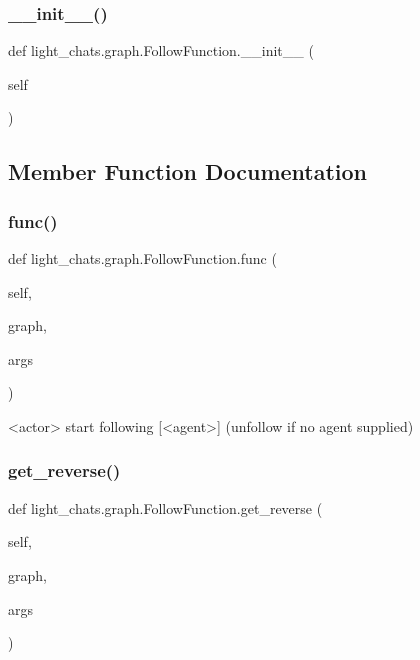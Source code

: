 \subsubsection{\texorpdfstring{\+\_\+\+\_\+init\+\_\+\+\_\+()}{\_\_init\_\_()}}
{\footnotesize\ttfamily def light\+\_\+chats.\+graph.\+Follow\+Function.\+\_\+\+\_\+init\+\_\+\+\_\+ (\begin{DoxyParamCaption}\item[{}]{self }\end{DoxyParamCaption})}



\subsection{Member Function Documentation}
\mbox{\label{classlight__chats_1_1graph_1_1FollowFunction_a6d1937938725b143930c10260adae130}} 
\subsubsection{\texorpdfstring{func()}{func()}}
{\footnotesize\ttfamily def light\+\_\+chats.\+graph.\+Follow\+Function.\+func (\begin{DoxyParamCaption}\item[{}]{self,  }\item[{}]{graph,  }\item[{}]{args }\end{DoxyParamCaption})}

\begin{DoxyVerb}<actor> start following [<agent>] (unfollow if no agent supplied)
\end{DoxyVerb}
 \mbox{\label{classlight__chats_1_1graph_1_1FollowFunction_a1421ab114b2675c3a138e6b005036022}} 
\subsubsection{\texorpdfstring{get\+\_\+reverse()}{get\_reverse()}}
{\footnotesize\ttfamily def light\+\_\+chats.\+graph.\+Follow\+Function.\+get\+\_\+reverse (\begin{DoxyParamCaption}\item[{}]{self,  }\item[{}]{graph,  }\item[{}]{args }\end{DoxyParamCaption})}



